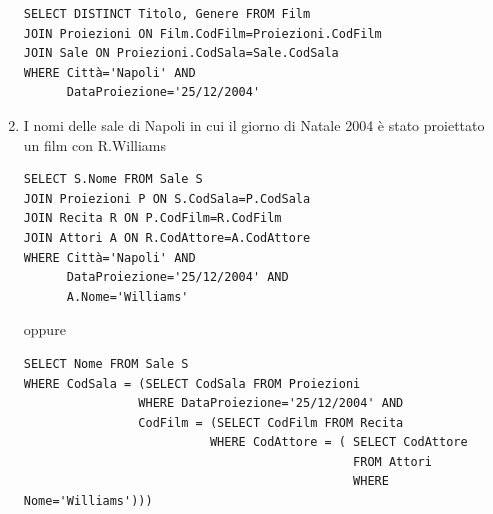 \documentclass[a4paper]{article}
\begin{document}
\begin{enumerate}[leftmargin=*]
\begin{verbatim}
SELECT DISTINCT Titolo, Genere FROM Film
JOIN Proiezioni ON Film.CodFilm=Proiezioni.CodFilm
JOIN Sale ON Proiezioni.CodSala=Sale.CodSala
WHERE Città='Napoli' AND
      DataProiezione='25/12/2004'
\end{verbatim}
\item  I nomi delle sale di Napoli in cui  il giorno di Natale 2004 è stato proiettato un film con R.Williams
\begin{verbatim}
SELECT S.Nome FROM Sale S
JOIN Proiezioni P ON S.CodSala=P.CodSala
JOIN Recita R ON P.CodFilm=R.CodFilm
JOIN Attori A ON R.CodAttore=A.CodAttore
WHERE Città='Napoli' AND
      DataProiezione='25/12/2004' AND
      A.Nome='Williams'
\end{verbatim}
oppure
\begin{verbatim}
SELECT Nome FROM Sale S
WHERE CodSala = (SELECT CodSala FROM Proiezioni
                WHERE DataProiezione='25/12/2004' AND
                CodFilm = (SELECT CodFilm FROM Recita
                          WHERE CodAttore = ( SELECT CodAttore
                                              FROM Attori
                                              WHERE Nome='Williams')))
\end{verbatim}
\end{enumerate}
\end{document}
